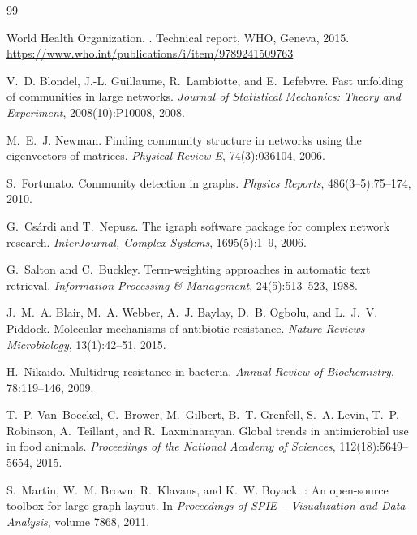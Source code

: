 \documentclass[12pt,a4paper]{article}
\begin{document}
\newpage

\begin{thebibliography}{99}

World Health Organization.
.
\newblock Technical report, WHO, Geneva, 2015.
\newblock \url{https://www.who.int/publications/i/item/9789241509763}

V.~D. Blondel, J.-L. Guillaume, R.~Lambiotte, and E.~Lefebvre.
\newblock Fast unfolding of communities in large networks.
\newblock \textit{Journal of Statistical Mechanics: Theory and Experiment},
  2008(10):P10008, 2008.

M.~E.~J. Newman.
\newblock Finding community structure in networks using the eigenvectors of
  matrices.
\newblock \textit{Physical Review E}, 74(3):036104, 2006.

S.~Fortunato.
\newblock Community detection in graphs.
\newblock \textit{Physics Reports}, 486(3--5):75--174, 2010.

G.~Cs{\'a}rdi and T.~Nepusz.
\newblock The igraph software package for complex network research.
\newblock \textit{InterJournal, Complex Systems}, 1695(5):1--9, 2006.

G.~Salton and C.~Buckley.
\newblock Term-weighting approaches in automatic text retrieval.
\newblock \textit{Information Processing \& Management}, 24(5):513--523, 1988.

J.~M.~A. Blair, M.~A. Webber, A.~J. Baylay, D.~B. Ogbolu, and L.~J.~V. Piddock.
\newblock Molecular mechanisms of antibiotic resistance.
\newblock \textit{Nature Reviews Microbiology}, 13(1):42--51, 2015.

H.~Nikaido.
\newblock Multidrug resistance in bacteria.
\newblock \textit{Annual Review of Biochemistry}, 78:119--146, 2009.

T.~P. Van~Boeckel, C.~Brower, M.~Gilbert, B.~T. Grenfell, S.~A. Levin,
  T.~P. Robinson, A.~Teillant, and R.~Laxminarayan.
\newblock Global trends in antimicrobial use in food animals.
\newblock \textit{Proceedings of the National Academy of Sciences},
  112(18):5649--5654, 2015.

S.~Martin, W.~M. Brown, R.~Klavans, and K.~W. Boyack.
: An open-source toolbox for large graph layout.
\newblock In \textit{Proceedings of SPIE -- Visualization and Data Analysis},
  volume 7868, 2011.

\end{thebibliography}
\end{document}
